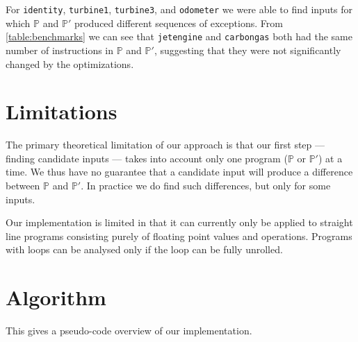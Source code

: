 \documentclass{article}
\begin{document}
For \texttt{identity}, \texttt{turbine1}, \texttt{turbine3}, and
\texttt{odometer} we were able to find inputs for which $\mathbb{P}$ and
$\mathbb{P'}$ produced different sequences of exceptions. From
\ref{table:benchmarks} we can see that \texttt{jetengine} and \texttt{carbongas}
both had the same number of instructions in $\mathbb{P}$ and $\mathbb{P'}$,
suggesting that they were not significantly changed by the optimizations.

\section{Limitations}

The primary theoretical limitation of our approach is that our first step —
finding candidate inputs — takes into account only one program ($\mathbb{P}$ or
$\mathbb{P'}$) at a time. We thus have no guarantee that a candidate input will
produce a difference between $\mathbb{P}$ and $\mathbb{P'}$. In practice we do
find such differences, but only for some inputs.

Our implementation is limited in that it can currently only be applied to
straight line programs consisting purely of floating point values and
operations. Programs with loops can be analysed only if the loop can be fully
unrolled.

\section{Algorithm}

This gives a pseudo-code overview of our implementation.
\end{document}
